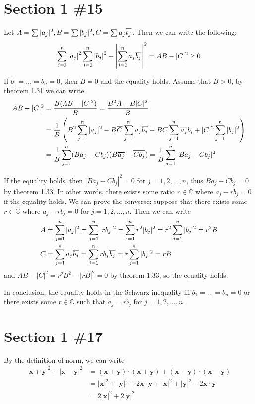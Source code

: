 \documentclass{scrartcl}
\newcommand\Overline[2][0.8pt]{%
  \begin{tikzpicture}[baseline=(a.base)]
    \node[inner xsep=0pt,inner ysep=1.5pt] (a) {$#2$};
    \draw[line width= #1] (a.north west) -- (a.north east);
  \end{tikzpicture}
}
\begin{document}
\section{Section 1 \#15}
Let \(A = \sum |a_j|^2, B = \sum |b_j|^2, C = \sum a_j \Overline{b_j}\).
Then we can write the following:
\[
  \sum_{j=1}^n \left| a_j \right|^2 \sum_{j=1}^n \left| b_j \right|^2 - \left| \sum_{j=1}^n a_j \Overline{b_j} \right|^2 = AB - |C|^2 \geq 0
\]

If \(b_1 = \dots = b_n = 0\), then \(B = 0\) and the equality holds.
Assume that \(B > 0\), by theorem 1.31 we can write
\begin{align*}
  AB - |C|^2 &= \frac{B(AB - |C|^2)}{B} = \frac{B^2 A - B|C|^2}{B} \\
             &= \frac{1}{B} \left( B^2 \sum_{j=1}^n |a_j|^2 - B\Overline{C} \sum_{j=1}^n a_j \Overline{b_j} - BC \sum_{j=1}^n \Overline{a_j}b_j + |C|^2 \sum_{j=1}^n |b_j|^2 \right) \\
             &= \frac{1}{B} \sum_{j=1}^n (Ba_j - Cb_j)(B\Overline{a_j} - \Overline{Cb_j}) = \frac{1}{B} \sum_{j=1}^n |Ba_j - Cb_j|^2
\end{align*}

If the equality holds, then \(|Ba_j - Cb_j|^2 = 0\) for \(j = 1, 2, \dots, n\), thus \(Ba_j - Cb_j = 0\) by theorem 1.33.
In other words, there exists some ratio \(r \in \mathbb{C}\) where \(a_j - rb_j = 0\) if the equality holds.
We can prove the converse: suppose that there exists some \(r \in \mathbb{C}\) where \(a_j - rb_j = 0\) for \(j = 1, 2, \dots, n\).
Then we can write
\begin{align*}
  A &= \sum_{j=1}^n |a_j|^2 = \sum_{j=1}^n |rb_j|^2 = \sum_{j=1}^n r^2 |b_j|^2 = r^2 \sum_{j=1}^n |b_j|^2 = r^2 B \\
  C &= \sum_{j=1}^n a_j \Overline{b_j} = \sum_{j=1}^n rb_j\Overline{b_j} = r\sum_{j=1}^n |b_j|^2 = rB
\end{align*}
and \(AB - |C|^2 = r^2 B^2 - |rB|^2 = 0\) by theorem 1.33, so the equality holds.

In conclusion, the equality holds in the Schwarz inequality iff \(b_1 = \dots = b_n =0\) or there exists some \(r \in \mathbb{C}\) such that \(a_j = rb_j\) for \(j = 1, 2, \dots, n\).

\section{Section 1 \#17}
By the definition of norm, we can write
\begin{align*}
  |\mathbf{x} + \mathbf{y}|^2 + |\mathbf{x} - \mathbf{y}|^2 &= (\mathbf{x} + \mathbf{y}) \cdot (\mathbf{x} + \mathbf{y}) + (\mathbf{x} - \mathbf{y}) \cdot (\mathbf{x} - \mathbf{y}) \\
                                                            &= |\mathbf{x}|^2 + |\mathbf{y}|^2 + 2\mathbf{x} \cdot \mathbf{y} + |\mathbf{x}|^2 + |\mathbf{y}|^2 - 2\mathbf{x} \cdot \mathbf{y} \\
                                                            &= 2|\mathbf{x}|^2 + 2|\mathbf{y}|^2
\end{align*}
\end{document}
